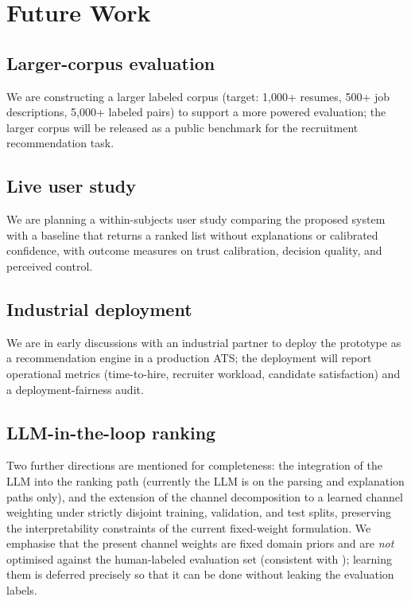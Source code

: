 \section{Future Work}\label{sec:7}

\subsection{Larger-corpus evaluation}
We are constructing a larger labeled corpus (target: 1,000+ resumes, 500+ job descriptions, 5,000+ labeled pairs) to support a more powered evaluation; the larger corpus will be released as a public benchmark for the recruitment recommendation task.

\subsection{Live user study}
We are planning a within-subjects user study comparing the proposed system with a baseline that returns a ranked list without explanations or calibrated confidence, with outcome measures on trust calibration, decision quality, and perceived control.

\subsection{Industrial deployment}
We are in early discussions with an industrial partner to deploy the prototype as a recommendation engine in a production ATS; the deployment will report operational metrics (time-to-hire, recruiter workload, candidate satisfaction) and a deployment-fairness audit.

\subsection{LLM-in-the-loop ranking}
Two further directions are mentioned for completeness: the integration of the LLM into the ranking path (currently the LLM is on the parsing and explanation paths only), and the extension of the channel decomposition to a learned channel weighting under strictly disjoint training, validation, and test splits, preserving the interpretability constraints of the current fixed-weight formulation. We emphasise that the present channel weights are fixed domain priors and are \emph{not} optimised against the human-labeled evaluation set (consistent with ); learning them is deferred precisely so that it can be done without leaking the evaluation labels.

